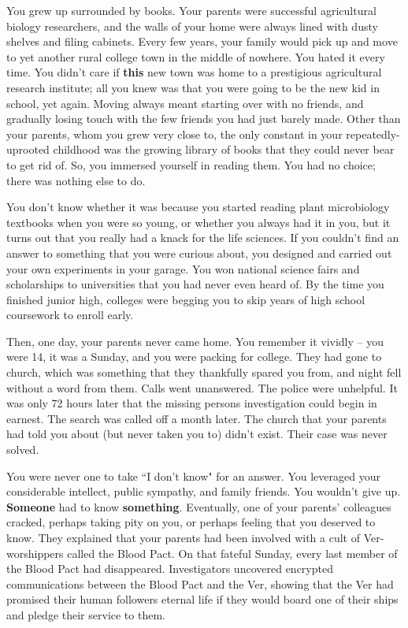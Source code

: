 \documentclass[char]{guildcamp4}
\begin{document}
\name{\cSpite{}}

You grew up surrounded by books. Your parents were successful agricultural biology researchers, and the walls of your home were always lined with dusty shelves and filing cabinets. Every few years, your family would pick up and move to yet another rural college town in the middle of nowhere. You hated it every time. You didn't care if {\bf this} new town was home to a prestigious agricultural research institute; all you knew was that you were going to be the new kid in school, yet again. Moving always meant starting over with no friends, and gradually losing touch with the few friends you had just barely made. Other than your parents, whom you grew very close to, the only constant in your repeatedly-uprooted childhood was the growing library of books that they could never bear to get rid of. So, you immersed yourself in reading them. You had no choice; there was nothing else to do.

You don't know whether it was because you started reading plant microbiology textbooks when you were so young, or whether you always had it in you, but it turns out that you really had a knack for the life sciences. If you couldn't find an answer to something that you were curious about, you designed and carried out your own experiments in your garage. You won national science fairs and scholarships to universities that you had never even heard of. By the time you finished junior high, colleges were begging you to skip years of high school coursework to enroll early. 

Then, one day, your parents never came home. You remember it vividly -- you were 14, it was a Sunday, and you were packing for college. They had gone to church, which was something that they thankfully spared you from, and night fell without a word from them. Calls went unanswered. The police were unhelpful. It was only 72 hours later that the missing persons investigation could begin in earnest. The search was called off a month later. The church that your parents had told you about (but never taken you to) didn't exist. Their case was never solved.

You were never one to take ``I don't know" for an answer. You leveraged your considerable intellect, public sympathy, and family friends. You wouldn't give up. {\bf Someone} had to know {\bf something}. Eventually, one of your parents' colleagues cracked, perhaps taking pity on you, or perhaps feeling that you deserved to know. They explained that your parents had been involved with a cult of Ver-worshippers called the Blood Pact. On that fateful Sunday, every last member of the Blood Pact had disappeared. Investigators uncovered encrypted communications between the Blood Pact and the Ver, showing that the Ver had promised their human followers eternal life if they would board one of their ships and pledge their service to them. 
\end{document}
